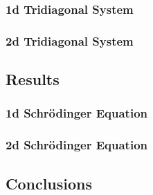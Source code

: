 \documentclass[10pt]{article}
\begin{document}
\subsubsection*{1d Tridiagonal System}


\subsubsection*{2d Tridiagonal System}


\subsection*{Results}

\subsubsection*{1d Schrödinger Equation}



\subsubsection*{2d Schrödinger Equation}




\subsection*{Conclusions}


\end{document}
